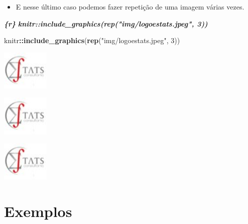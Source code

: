 \documentclass[
]{book}
\newenvironment{Shaded}{\begin{snugshade}}{\end{snugshade}}
\newcommand{\DecValTok}[1]{\textcolor[rgb]{0.00,0.00,0.81}{#1}}
\newcommand{\InformationTok}[1]{\textcolor[rgb]{0.56,0.35,0.01}{\textbf{\textit{#1}}}}
\newcommand{\KeywordTok}[1]{\textcolor[rgb]{0.13,0.29,0.53}{\textbf{#1}}}
\newcommand{\NormalTok}[1]{#1}
\newcommand{\OperatorTok}[1]{\textcolor[rgb]{0.81,0.36,0.00}{\textbf{#1}}}
\newcommand{\StringTok}[1]{\textcolor[rgb]{0.31,0.60,0.02}{#1}}
\providecommand{\tightlist}{%
  \setlength{\itemsep}{0pt}\setlength{\parskip}{0pt}}
\begin{document}
\begin{itemize}
\tightlist
\item
  E nesse último caso podemos fazer repetição de uma imagem várias vezes.
\end{itemize}

\begin{Shaded}
\begin{Highlighting}[]
\InformationTok{\textasciigrave{}\textasciigrave{}\textasciigrave{}\{r\}}
\InformationTok{knitr::include\_graphics(rep("img/logoestats.jpeg", 3))}
\InformationTok{\textasciigrave{}\textasciigrave{}\textasciigrave{}}
\end{Highlighting}
\end{Shaded}

\begin{Shaded}
\begin{Highlighting}[]
\NormalTok{knitr}\OperatorTok{::}\KeywordTok{include\_graphics}\NormalTok{(}\KeywordTok{rep}\NormalTok{(}\StringTok{"img/logoestats.jpeg"}\NormalTok{, }\DecValTok{3}\NormalTok{))}
\end{Highlighting}
\end{Shaded}

\begin{center}\includegraphics[width=0.89in]{img/logoestats} \end{center}

\begin{center}\includegraphics[width=0.89in]{img/logoestats} \end{center}

\begin{center}\includegraphics[width=0.89in]{img/logoestats} \end{center}

\hypertarget{exemplos}{%
\section{Exemplos}\label{exemplos}}
\end{document}
